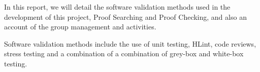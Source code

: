 In this report, we will detail the software validation methods used in the development of this project, Proof Searching and Proof Checking, and also an account of the group management and activities.

Software validation methods include the use of unit testing, HLint, code reviews, stress testing and a combination of a combination of grey-box and white-box testing.
